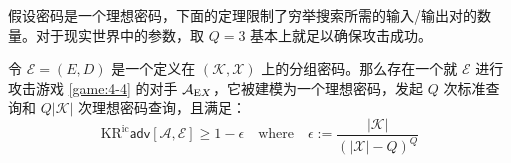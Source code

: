 \begin{snote}[穷举搜索。]
假设密码是一个理想密码，下面的定理限制了穷举搜索所需的输入/输出对的数量。对于现实世界中的参数，取 $Q=3$ 基本上就足以确保攻击成功。
\end{snote}

\begin{theorem}\label{theo:4-12}
令 $\mathcal{E}=(E,D)$ 是一个定义在 $(\mathcal{K},\mathcal{X})$ 上的分组密码。那么存在一个就 $\mathcal{E}$ 进行攻击游戏 \ref{game:4-4} 的对手 $\mathcal{A}_{{\rm E}X}$，它被建模为一个理想密码，发起 $Q$ 次标准查询和 $Q|\mathcal{K}|$ 次理想密码查询，且满足：
\begin{equation}\label{eq:4-34}
\mathrm{KR^{ic}}\mathsf{adv}[\mathcal{A},\mathcal{E}]\geq1-\epsilon
\quad\text{where}\quad
\epsilon:=\frac{|\mathcal{K}|}{(|\mathcal{X}|-Q)^Q}
\end{equation}
\end{theorem}

